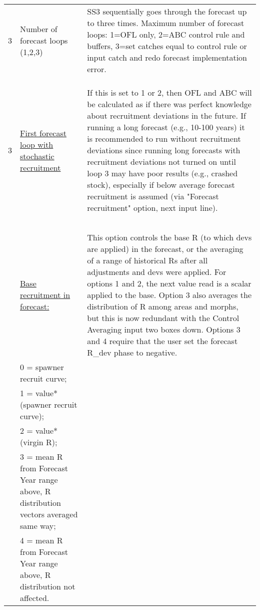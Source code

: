 \begin{landscape}
{\begin{longtable}{p{3.2cm} p{7cm} p{10.8cm}}
 \hline
 3 \Tstrut & Number of forecast loops (1,2,3) & \multirow{1}{1cm}[-0.25cm]{\parbox{11cm}{SS3 sequentially goes through the forecast up to three times.  Maximum number of forecast loops: 1=OFL only, 2=ABC control rule and buffers, 3=set catches equal to control rule or input catch and redo forecast implementation error.}} \\
 & & \\
 & & \\
 & & \Bstrut\Bstrut\\
 
 \hline  
 3 \Tstrut & \hyperlink{appendB}{First forecast loop with stochastic recruitment} & \multirow{1}{1cm}[-0.25cm]{\parbox{11cm}{If this is set to 1 or 2, then OFL and ABC will be calculated as if there was perfect knowledge about recruitment deviations in the future. If running a long forecast (e.g., 10-100 years) it is recommended to run without recruitment deviations since running long forecasts with recruitment deviations not turned on until loop 3 may have poor results (e.g., crashed stock), especially if below average forecast recruitment is assumed (via "Forecast recruitment" option, next input line). }} \Bstrut\\
  & & \\
  & & \\
  & & \\
  & & \\
  & & \\
 
 \pagebreak
 1 \Tstrut & \hyperlink{ForeSpawn}{Base recruitment in forecast:} & \multirow{1}{1cm}[-0.25cm]{\parbox{11cm}{This option controls the base R (to which devs are applied) in the forecast, or the averaging of a range of historical Rs after all adjustments and devs were applied. For options 1 and 2, the next value read is a scalar applied to the base. Option 3 also averages the distribution of R among areas and morphs, but this is now redundant with the Control Averaging input two boxes down. Options 3 and 4 require that the user set the forecast R\_dev phase to negative.}} \\
    & 0 = spawner recruit curve; & \\
    & 1 = value*(spawner recruit curve); & \\
    & 2 = value*(virgin R); & \\
    & 3 = mean R from Forecast Year range above, R distribution vectors averaged same way; & \\
    & 4 = mean R from Forecast Year range above, R distribution not affected. & \Bstrut\\
     

\end{longtable}}
\end{landscape}
